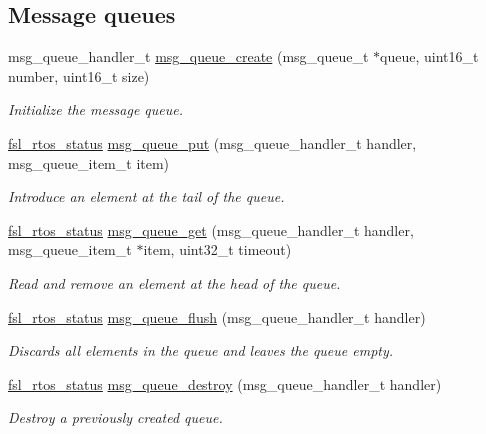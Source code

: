 \subsection*{Message queues}
\begin{DoxyCompactItemize}
\item 
msg\+\_\+queue\+\_\+handler\+\_\+t \hyperlink{group__os__abstraction_gad36f00178a6c72d1805ceaf473124669}{msg\+\_\+queue\+\_\+create} (msg\+\_\+queue\+\_\+t $\ast$queue, uint16\+\_\+t number, uint16\+\_\+t size)
\begin{DoxyCompactList}\small\item\em Initialize the message queue. \end{DoxyCompactList}\item 
\hyperlink{group__os__abstraction_gaea1a100f413fd124de281c4b493e99d5}{fsl\+\_\+rtos\+\_\+status} \hyperlink{group__os__abstraction_gaa1c19694dd9bf19c1d00fded763a9824}{msg\+\_\+queue\+\_\+put} (msg\+\_\+queue\+\_\+handler\+\_\+t handler, msg\+\_\+queue\+\_\+item\+\_\+t item)
\begin{DoxyCompactList}\small\item\em Introduce an element at the tail of the queue. \end{DoxyCompactList}\item 
\hyperlink{group__os__abstraction_gaea1a100f413fd124de281c4b493e99d5}{fsl\+\_\+rtos\+\_\+status} \hyperlink{group__os__abstraction_gaece3a5bfb582c574f1272ae56668a85f}{msg\+\_\+queue\+\_\+get} (msg\+\_\+queue\+\_\+handler\+\_\+t handler, msg\+\_\+queue\+\_\+item\+\_\+t $\ast$item, uint32\+\_\+t timeout)
\begin{DoxyCompactList}\small\item\em Read and remove an element at the head of the queue. \end{DoxyCompactList}\item 
\hyperlink{group__os__abstraction_gaea1a100f413fd124de281c4b493e99d5}{fsl\+\_\+rtos\+\_\+status} \hyperlink{group__os__abstraction_ga3ef09a164e31f7074d9ab88fb7508056}{msg\+\_\+queue\+\_\+flush} (msg\+\_\+queue\+\_\+handler\+\_\+t handler)
\begin{DoxyCompactList}\small\item\em Discards all elements in the queue and leaves the queue empty. \end{DoxyCompactList}\item 
\hyperlink{group__os__abstraction_gaea1a100f413fd124de281c4b493e99d5}{fsl\+\_\+rtos\+\_\+status} \hyperlink{group__os__abstraction_gab4a03735bd9b6faa41c879fcc6ab0f7f}{msg\+\_\+queue\+\_\+destroy} (msg\+\_\+queue\+\_\+handler\+\_\+t handler)
\begin{DoxyCompactList}\small\item\em Destroy a previously created queue. \end{DoxyCompactList}\end{DoxyCompactItemize}


